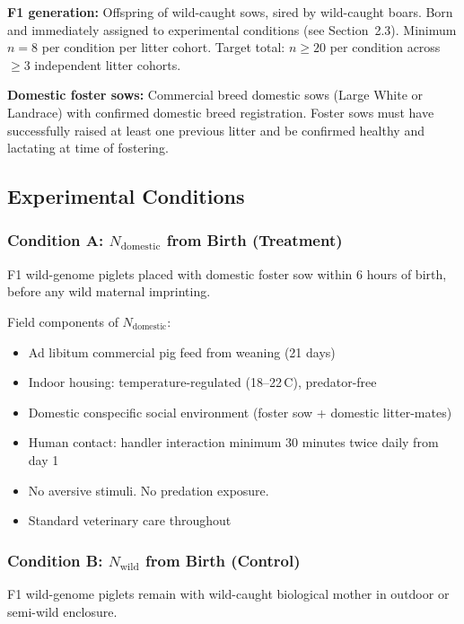 \documentclass[10pt, a4paper]{article}
\begin{document}
\textbf{F1 generation:}
Offspring of wild-caught sows, sired by
wild-caught boars. Born and immediately assigned
to experimental conditions (see Section~2.3).
Minimum $n = 8$ per condition per litter cohort.
Target total: $n \geq 20$ per condition across
$\geq 3$ independent litter cohorts.

\textbf{Domestic foster sows:}
Commercial breed domestic sows (Large White or
Landrace) with confirmed domestic breed registration.
Foster sows must have successfully raised at least
one previous litter and be confirmed healthy and
lactating at time of fostering.

\subsection{Experimental Conditions}

\subsubsection{Condition A: $N_{\text{domestic}}$
from Birth (Treatment)}

F1 wild-genome piglets placed with domestic foster
sow within 6 hours of birth, before any wild maternal
imprinting.

Field components of $N_{\text{domestic}}$:
\begin{itemize}[itemsep=0.1em]
  \item Ad libitum commercial pig feed from weaning
    (21 days)
  \item Indoor housing: temperature-regulated
    (18--22\,\textdegree C), predator-free
  \item Domestic conspecific social environment
    (foster sow + domestic litter-mates)
  \item Human contact: handler interaction minimum
    30 minutes twice daily from day 1
  \item No aversive stimuli. No predation exposure.
  \item Standard veterinary care throughout
\end{itemize}

\subsubsection{Condition B: $N_{\text{wild}}$
from Birth (Control)}

F1 wild-genome piglets remain with wild-caught
biological mother in outdoor or semi-wild enclosure.
\end{document}

